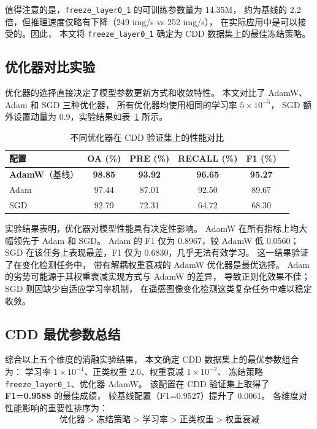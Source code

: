 \documentclass[UTF8]{ctexart}
\begin{document}
值得注意的是，\texttt{freeze\_layer0\_1} 的可训练参数量为 14.35M，
约为基线的 2.2 倍，但推理速度仅略有下降（249 img/s vs 252 img/s），
在实际应用中是可以接受的。因此，
本文将 \texttt{freeze\_layer0\_1} 确定为 CDD 数据集上的最佳冻结策略。

\subsection{优化器对比实验}

优化器的选择直接决定了模型参数更新方式和收敛特性。
本文对比了 AdamW、Adam 和 SGD 三种优化器，
所有优化器均使用相同的学习率 $5\times10^{-5}$，
SGD 额外设置动量为 0.9，实验结果如表~\ref{tab:opt_scan} 所示。

\begin{table}[htbp]
\centering
\caption{不同优化器在 CDD 验证集上的性能对比}
\label{tab:opt_scan}
\begin{tabular}{lccccc}
\hline
配置 & OA (\%) & PRE (\%) & RECALL (\%) & F1 (\%) \\
\hline
\textbf{AdamW}（基线） & \textbf{98.85} & \textbf{93.92} & \textbf{96.65} & \textbf{95.27} \\
Adam & 97.44 & 87.01 & 92.50 & 89.67 \\
SGD & 92.79 & 72.31 & 64.72 & 68.30 \\
\hline
\end{tabular}
\end{table}

实验结果表明，优化器对模型性能具有决定性影响。
AdamW 在所有指标上均大幅领先于 Adam 和 SGD。
Adam 的 F1 仅为 0.8967，较 AdamW 低 0.0560；
SGD 在该任务上表现最差，F1 仅为 0.6830，几乎无法有效学习。
这一结果验证了在变化检测任务中，
带有解耦权重衰减的 AdamW 优化器是最优选择。
Adam 的劣势可能源于其权重衰减实现方式与 AdamW 的差异，
导致正则化效果不佳；
SGD 则因缺少自适应学习率机制，
在遥感图像变化检测这类复杂任务中难以稳定收敛。

\subsection{CDD 最优参数总结}

综合以上五个维度的消融实验结果，
本文确定 CDD 数据集上的最优参数组合为：
学习率 $1\times10^{-4}$、正类权重 $2.0$、权重衰减 $1\times10^{-2}$、
冻结策略 \texttt{freeze\_layer0\_1}、优化器 AdamW。
该配置在 CDD 验证集上取得了 \textbf{F1=0.9588} 的最佳成绩，
较基线配置（F1=0.9527）提升了 0.0061。
各维度对性能影响的重要性排序为：
\begin{equation}
\text{优化器} > \text{冻结策略} > \text{学习率} > \text{正类权重} > \text{权重衰减}
\end{equation}
\end{document}
